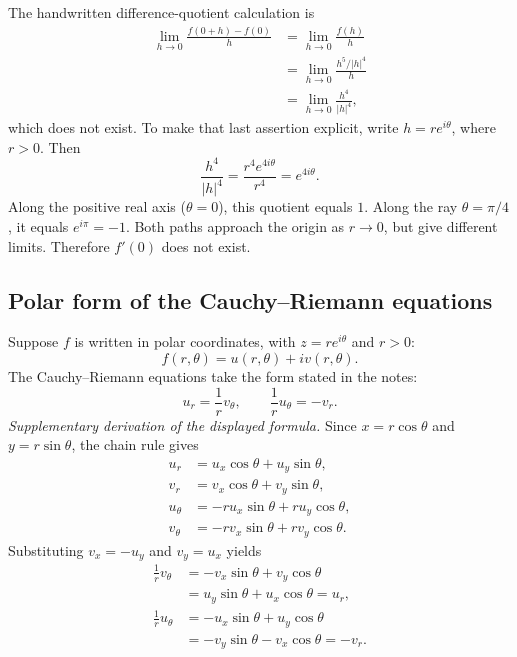 \documentclass[11pt]{article}
\begin{document}
The handwritten difference-quotient calculation is
\begin{align*}
 \lim_{h\to0}\frac{f(0+h)-f(0)}h
 &=\lim_{h\to0}\frac{f(h)}h\\
 &=\lim_{h\to0}\frac{h^5/|h|^4}{h}\\
 &=\lim_{h\to0}\frac{h^4}{|h|^4},
\end{align*}
which does not exist. To make that last assertion explicit, write
$h=re^{i\theta}$, where $r>0$. Then
\[
 \frac{h^4}{|h|^4}=\frac{r^4e^{4i\theta}}{r^4}=e^{4i\theta}.
\]
Along the positive real axis ($\theta=0$), this quotient equals $1$.
Along the ray $\theta=\pi/4$, it equals $e^{i\pi}=-1$.
Both paths approach the origin as $r\to0$, but give different limits.
Therefore $f'(0)$ does not exist.

\subsection{Polar form of the Cauchy--Riemann equations}
Suppose $f$ is written in polar coordinates, with $z=re^{i\theta}$ and $r>0$:
\[
 f(r,\theta)=u(r,\theta)+iv(r,\theta).
\]
The Cauchy--Riemann equations take the form stated in the notes:
\[
 \boxed{u_r=\frac1r v_\theta,\qquad
 \frac1r u_\theta=-v_r.}
\]
\textit{Supplementary derivation of the displayed formula.}
Since $x=r\cos\theta$ and $y=r\sin\theta$, the chain rule gives
\begin{align*}
 u_r&=u_x\cos\theta+u_y\sin\theta,\\
 v_r&=v_x\cos\theta+v_y\sin\theta,\\
 u_\theta&=-r u_x\sin\theta+r u_y\cos\theta,\\
 v_\theta&=-r v_x\sin\theta+r v_y\cos\theta.
\end{align*}
Substituting $v_x=-u_y$ and $v_y=u_x$ yields
\begin{align*}
 \frac1r v_\theta
 &=-v_x\sin\theta+v_y\cos\theta\\
 &=u_y\sin\theta+u_x\cos\theta=u_r,\\[0.3em]
 \frac1r u_\theta
 &=-u_x\sin\theta+u_y\cos\theta\\
 &=-v_y\sin\theta-v_x\cos\theta=-v_r.
\end{align*}
\end{document}
